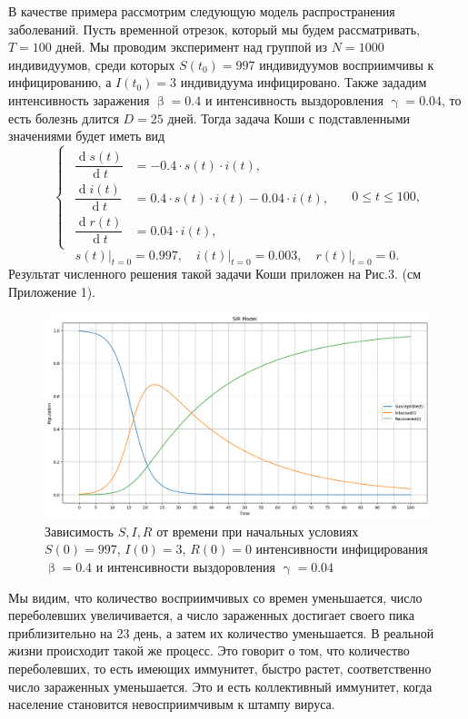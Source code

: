 \documentclass[a4paper, 12pt]{extarticle}
\numberwithin{equation}{section}
\renewcommand{\leq}{\leqslant}
\renewcommand{\beta}{\upbeta}
\renewcommand{\gamma}{\upgamma}
\renewcommand{\d}{\operatorname{d}}
\begin{document}
	В качестве примера рассмотрим следующую модель распространения заболеваний. Пусть временной отрезок, который мы будем рассматривать, $T = 100$ дней. Мы проводим эксперимент над группой из $N=1000$ индивидуумов, среди которых $S(t_0) = 997$ индивидуумов восприимчивы к инфицированию, а $I(t_0) = 3$ индивидуума инфицировано. Также зададим интенсивность заражения $\beta = 0.4$ и интенсивность выздоровления $\gamma = 0.04$, то есть болезнь длится $D = 25$ дней.
	Тогда задача Коши с подставленными значениями будет иметь вид 
	$$
	\left\{ 
	\begin{gathered} 
		\begin{aligned}
			\dfrac {\d s(t)}{\d t} &= -0.4 \cdot s(t) \cdot i(t),\\
			\dfrac{\d i(t)}{\d t} &= 0.4 \cdot s(t)\cdot i(t) - 0.04\cdot i(t),\\
			\dfrac{\d r(t)}{\d t} &= 0.04\cdot i(t),
		\end{aligned}
	\end{gathered} 
	\right.\quad 0\leq t \leq 100,
	$$
	$$
	s(t)\Big|_{t=0} = 0.997,\quad i(t)\Big|_{t=0} = 0.003,\quad r(t)\Big|_{t=0} = 0.
	$$
	Результат численного решения такой задачи Коши приложен на Рис.3. (см Приложение 1).
	\begin{figure}[h]
		\centering
		\includegraphics[scale=0.45]{images/img01}
		\caption{Зависимость $S, I, R$ от времени при начальных условиях $S(0) = 997$, $I(0) = 3$, $R(0) = 0$
			интенсивности инфицирования $\beta = 0.4$ и интенсивности выздоровления $\gamma = 0.04$}
		\label{fig:img01}
	\end{figure}
	
	Мы видим, что количество восприимчивых со времен уменьшается, число переболевших увеличивается, а число зараженных достигает своего пика приблизительно на 23 день, а затем их количество уменьшается. В реальной жизни происходит такой же процесс. Это говорит о том, что количество переболевших, то есть имеющих иммунитет, быстро растет, соответственно число зараженных уменьшается. Это и есть коллективный иммунитет, когда население становится невосприимчивым к штампу
	вируса. 
	
\end{document}
